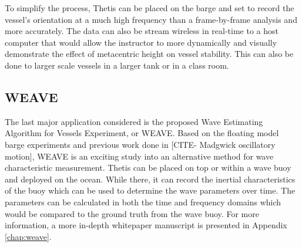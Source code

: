 To simplify the process, Thetis can be placed on the barge and set to record the vessel's orientation at a much high frequency than a frame-by-frame analysis and more accurately.
The data can also be stream wireless in real-time to a host computer that would allow the instructor to more dynamically and visually demonstrate the effect of metacentric height on vessel stability.
This can also be done to larger scale vessels in a larger tank or in a class room.

\subsection{WEAVE}
The last major application considered is the proposed Wave Estimating Algorithm for Vessels Experiment, or WEAVE.
Based on the floating model barge experiments and previous work done in [CITE- Madgwick oscillatory motion], WEAVE is an exciting study into an alternative method for wave characteristic measurement.
Thetis can be placed on top or within a wave buoy and deployed on the ocean.
While there, it can record the inertial characteristics of the buoy which can be used to determine the wave parameters over time.
The parameters can be calculated in both the time and frequency domains which would be compared to the ground truth from the wave buoy.
For more information, a more in-depth whitepaper manuscript is presented in Appendix \ref{chap:weave}.